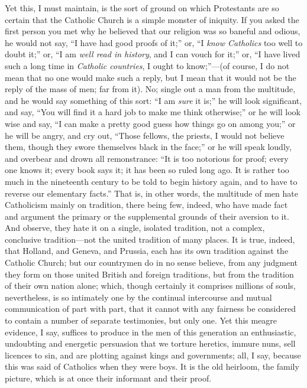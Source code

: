 Yet this, I must maintain, is the sort of ground on
which Protestants are so certain that the Catholic Church
is a simple monster of iniquity. If you asked the first
person you met why he believed that our religion was so
baneful and odious, he would not say, ``I have had
good proofs of it;'' or, ``I \emph{know Catholics}
too well to doubt it;'' or, ``I am \emph{well read
in history}, and I can vouch for it;'' or,
``I have lived such a long time in \emph{Catholic
countries}, I ought to know;''—(of course, I
do not mean that no one would make such a reply, but I
mean that it would not be the reply of the mass of men;
far from it). No; single out a man from the multitude,
and he would say something of this sort: ``I am \emph{sure}
it is;'' he will look significant, and say, ``You
will find it a hard job to make me think otherwise;''
or he will look wise and say, ``I can make a pretty
good guess how things go on among you;'' or he will
be angry, and cry out, ``Those fellows, the priests,
I would not believe them, though they swore themselves
black in the face;'' or he will speak loudly, and
overbear and drown all remonstrance: ``It is too
notorious for proof; every one knows it; every book says
it; it has been so ruled long ago. It is rather too much
in the nineteenth century to be told to begin history
again, and to have to reverse our elementary facts.''
That is, in other words, the multitude of men hate
Catholicism mainly on tradition, there being few, indeed,
who have made fact and argument the primary or the
supplemental grounds of their aversion to it. And
observe, they hate it on a single, isolated tradition,
not a complex, conclusive tradition—not the united
tradition of many places. It is true, indeed, that
Holland, and Geneva, and Prussia, each has its own
tradition against the Catholic Church; but our countrymen
do in no sense believe, from any judgment they form on
those united British and foreign traditions, but from the
tradition of their own nation alone; which, though
certainly it comprises millions of souls, nevertheless,
is so intimately one by the continual intercourse and
mutual communication of part with part, that it cannot
with any fairness be considered to contain a number of
separate testimonies, but only one. Yet this meagre
evidence, I say, suffices to produce in the men of this
generation an enthusiastic, undoubting and energetic
persuasion that we torture heretics, immure nuns, sell
licences to sin, and are plotting against kings and
governments; all, I say, because this was said of
Catholics when they were boys. It is the old heirloom,
the family picture, which is at once their informant and
their proof.

